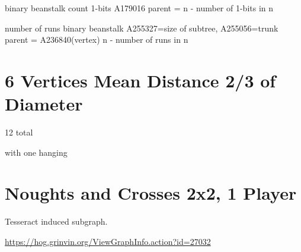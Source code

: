 \documentclass{article}
\begin{document}
binary beanstalk count 1-bits A179016
  parent = n - number of 1-bits in n

number of runs binary beanstalk A255327=size of subtree, A255056=trunk
  parent = A236840(vertex)   n - number of runs in n



\section{6 Vertices Mean Distance 2/3 of Diameter}

12 total

with one hanging
\begin{center}
\end{center}




\section{Noughts and Crosses 2x2, 1 Player}

Tesseract induced subgraph.

\url{https://hog.grinvin.org/ViewGraphInfo.action?id=27032}
\end{document}
